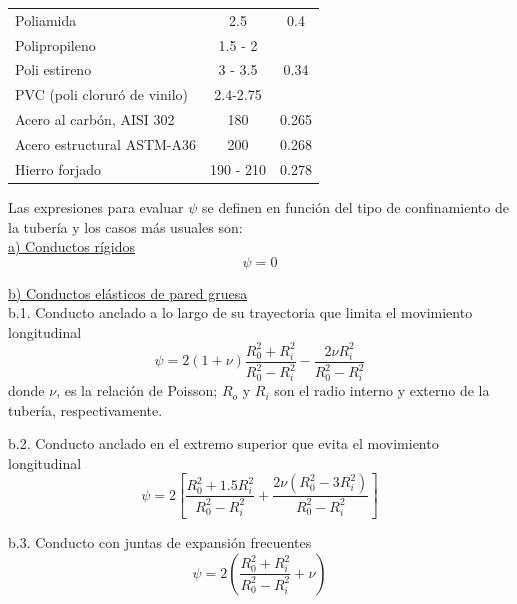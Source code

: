 \documentclass[letterpaper]{report}
\begin{document}
\begin{table}[]
\begin{center}
\begin{longtable}{|l|c|c|}
		Poliamida                                & 2.5       & 0.4   \\
		Polipropileno                            & 1.5 - 2   &       \\
		Poli estireno                            & 3 - 3.5   & 0.34  \\
		PVC (poli cloruró de vinilo)             & 2.4-2.75  &       \\
		Acero al carbón, AISI 302                & 180       & 0.265 \\
		Acero estructural ASTM-A36               & 200       & 0.268 \\
		Hierro forjado                           & 190 - 210 & 0.278 \\ \hline
\end{longtable}
\end{center}
\end{table}

Las expresiones para evaluar $\psi$ se definen en función del tipo de confinamiento de la tubería y los casos más usuales son:\\
\underline{a) Conductos rígidos}
\begin{equation}
	\psi = 0
	\label{eq:crig}
\end{equation}

\underline{b) Conductos elásticos de pared gruesa}\\
b.1. Conducto anclado a lo largo de su trayectoria que limita el movimiento longitudinal
\begin{equation}
	\psi=2\left(1+\nu\right)\frac{R_0^2+R_i^2}{R_0^2-R_i^2}-\frac{2\nu R_i^2}{R_0^2-R_i^2}
	\label{eq:casob1}
\end{equation}
donde $\nu$, es la relación de Poisson; $R_o$ y $R_i$ son el radio interno y externo de la tubería, respectivamente.\bigskip

b.2. Conducto anclado en el extremo superior que evita el movimiento longitudinal
\begin{equation}
	\psi=2\left[\frac{R_0^2+1.5R_i^2}{R_0^2-R_i^2}+\frac{2\nu(R_0^2-3R_i^2)}{R_0^2-R_i^2}\right]
	\label{eq:caso2}
\end{equation}

b.3. Conducto con juntas de expansión frecuentes
\begin{equation}
	\psi=2\left(\frac{R_0^2+R_i^2}{R_0^2-R_i^2}+\nu\right)
	\label{eq:caso3}
\end{equation}
\end{document}

